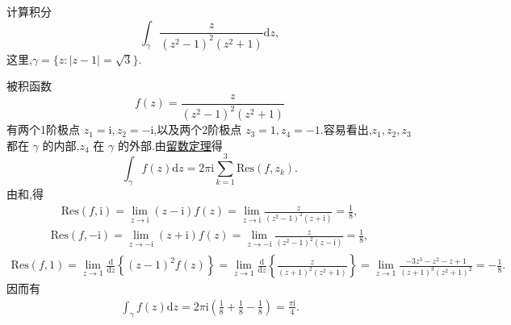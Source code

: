 \documentclass[../../main.tex]{subfiles}%
\begin{document}
\begin{example}
计算积分
\[
\int_{\gamma} \frac{z}{(z^2 - 1)^2 (z^2 + 1)} \mathrm{d}z,
\]
这里,\( \gamma = \{ z: |z - 1| = \sqrt{3} \} \).
\end{example}
\begin{solution}
被积函数
\[
f(z) = \frac{z}{(z^2 - 1)^2 (z^2 + 1)}
\]
有两个1阶极点 \( z_1 = \mathrm{i}, z_2 = -\mathrm{i} \),以及两个2阶极点 \( z_3 = 1, z_4 = -1 \).容易看出,\( z_1, z_2, z_3 \) 都在 \( \gamma \) 的内部,\( z_4 \) 在 \( \gamma \) 的外部.由\hyperref[theorem:留数定理(残数定理)-定理5.4.9]{留数定理}得
\[
\int_{\gamma} f(z) \mathrm{d}z = 2\pi \mathrm{i} \sum_{k = 1}^{3} \mathrm{Res}(f, z_k).
\]
由和,得
\begin{align*}
\mathrm{Res}(f, \mathrm{i}) = \lim_{z \to \mathrm{i}} (z - \mathrm{i}) f(z) = \lim_{z \to \mathrm{i}} \frac{z}{(z^2 - 1)^2 (z + \mathrm{i})} = \frac{1}{8},
\end{align*}
\begin{align*}
\mathrm{Res}(f, -\mathrm{i}) = \lim_{z \to -\mathrm{i}} (z + \mathrm{i}) f(z) = \lim_{z \to -\mathrm{i}} \frac{z}{(z^2 - 1)^2 (z - \mathrm{i})} = \frac{1}{8},
\end{align*}
\begin{align*}
\mathrm{Res}(f, 1) = \lim_{z \to 1} \frac{\mathrm{d}}{\mathrm{d}z} \left\{ (z - 1)^2 f(z) \right\} = \lim_{z \to 1} \frac{\mathrm{d}}{\mathrm{d}z} \left\{ \frac{z}{(z + 1)^2 (z^2 + 1)} \right\} = \lim_{z \to 1} \frac{-3z^3 - z^2 - z + 1}{(z + 1)^3 (z^2 + 1)^2} = -\frac{1}{8}.
\end{align*}
因而有
\begin{align*}
\int_{\gamma} f(z) \mathrm{d}z = 2\pi \mathrm{i} \left( \frac{1}{8} + \frac{1}{8} - \frac{1}{8} \right) = \frac{\pi \mathrm{i}}{4}.
\end{align*}

\end{solution}
\end{document}
